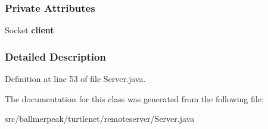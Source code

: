 \subsubsection*{Private Attributes}
\begin{DoxyCompactItemize}
\item 
\hypertarget{classballmerpeak_1_1turtlenet_1_1remoteserver_1_1Session_a2506d1b24e158edf2fcfd2a31d57f43a}{Socket {\bfseries client}}\label{classballmerpeak_1_1turtlenet_1_1remoteserver_1_1Session_a2506d1b24e158edf2fcfd2a31d57f43a}

\end{DoxyCompactItemize}


\subsubsection{Detailed Description}


Definition at line 53 of file Server.\-java.



The documentation for this class was generated from the following file\-:\begin{DoxyCompactItemize}
\item 
src/ballmerpeak/turtlenet/remoteserver/Server.\-java\end{DoxyCompactItemize}
